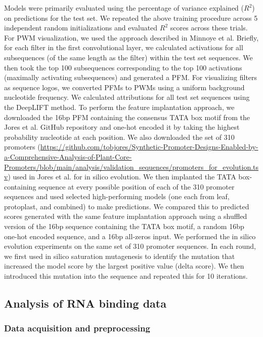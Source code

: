 Models were primarily evaluated using the percentage of variance explained ($R^2$) on predictions for the test set. We repeated the above training procedure across 5 independent random initializations and evaluated $R^2$ scores across these trials. For PWM visualization, we used the approach described in Minnoye et al.\cite{Minnoye2020-vz} Briefly, for each filter in the first convolutional layer, we calculated activations for all subsequences (of the same length as the filter) within the test set sequences. We then took the top 100 subsequences corresponding to the top 100 activations (maximally activating subsequences) and generated a PFM. For visualizing filters as sequence logos, we converted PFMs to PWMs using a uniform background nucleotide frequency. We calculated attributions for all test set sequences using the DeepLIFT method\cite{Shrikumar2016-lf}. To perform the feature implantation approach, we downloaded the 16bp PFM containing the consensus TATA box motif from the Jores et al. GitHub repository and one-hot encoded it by taking the highest probability nucleotide at each position. We also downloaded the set of 310 promoters (\url{https://github.com/tobjores/Synthetic-Promoter-Designs-Enabled-by-a-Comprehensive-Analysis-of-Plant-Core-Promoters/blob/main/analysis/validation_sequences/promoters_for_evolution.tsv}) used in Jores et al. for in silico evolution. We then implanted the TATA box-containing sequence at every possible position of each of the 310 promoter sequences and used selected high-performing models (one each from leaf, protoplast, and combined) to make predictions. We compared this to predicted scores generated with the same feature implantation approach using a shuffled version of the 16bp sequence containing the TATA box motif, a random 16bp one-hot encoded sequence, and a 16bp all-zeros input. We performed the in silico evolution experiments on the same set of 310 promoter sequences\cite{Jores2021-iu}. In each round, we first used in silico saturation mutagenesis to identify the mutation that increased the model score by the largest positive value (delta score). We then introduced this mutation into the sequence and repeated this for 10 iterations.

\subsection{Analysis of RNA binding data}

\subsubsection{Data acquisition and preprocessing}

